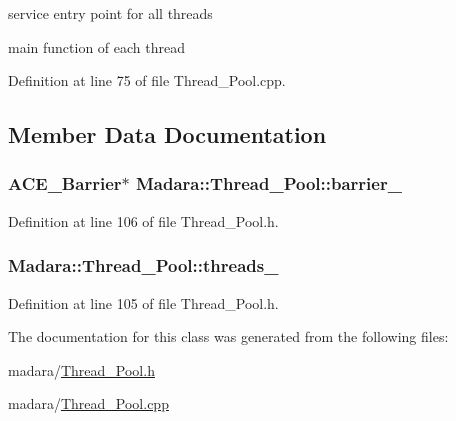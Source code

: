 service entry point for all threads 

main function of each thread 

Definition at line 75 of file Thread\_\-Pool.cpp.



\subsection{Member Data Documentation}
\hypertarget{classMadara_1_1Thread__Pool_a48d8574671ba53c9b04b6968b8d59e0a}{
\subsubsection[{barrier\_\-}]{\setlength{\rightskip}{0pt plus 5cm}ACE\_\-Barrier$\ast$ {\bf Madara::Thread\_\-Pool::barrier\_\-}}}
\label{de/de8/classMadara_1_1Thread__Pool_a48d8574671ba53c9b04b6968b8d59e0a}


Definition at line 106 of file Thread\_\-Pool.h.

\hypertarget{classMadara_1_1Thread__Pool_a91bae0866bed581096f3bcf9aa538e85}{
\subsubsection[{threads\_\-}]{ {\bf Madara::Thread\_\-Pool::threads\_\-}}}
\label{de/de8/classMadara_1_1Thread__Pool_a91bae0866bed581096f3bcf9aa538e85}


Definition at line 105 of file Thread\_\-Pool.h.



The documentation for this class was generated from the following files:\begin{DoxyCompactItemize}
\item 
madara/\hyperlink{Thread__Pool_8h}{Thread\_\-Pool.h}\item 
madara/\hyperlink{Thread__Pool_8cpp}{Thread\_\-Pool.cpp}\end{DoxyCompactItemize}
